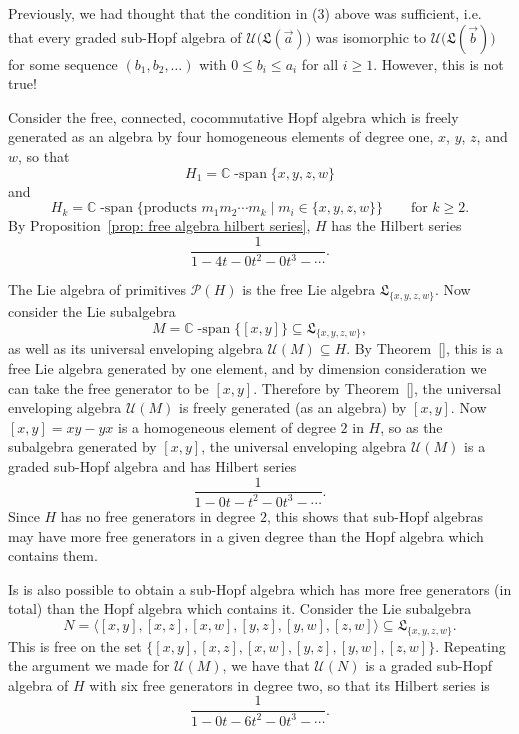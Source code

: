 \documentclass[11pt]{amsart}
\theoremstyle{definition}
\numberwithin{equation}{section}
\def\CC{{\mathbb C}}
\newcommand{\lucas}[1]{\todo[size=\tiny,color=red]{#1 \\ \hfill --- Lucas}}
\begin{document}
Previously, we had thought that the condition in (3) above was sufficient, i.e. that every graded sub-Hopf algebra of $\mathcal{U}\big(\mathfrak{L}(\vec{a})\big)$ was isomorphic to $\mathcal{U}\big(\mathfrak{L}(\vec{b})\big)$ for some sequence $(b_{1}, b_{2}, \ldots)$ with $0 \le b_{i} \le a_{i}$ for all $i \ge 1$.  However, this is not true!  

Consider the free, connected, cocommutative Hopf algebra which is freely generated as an algebra by four homogeneous elements of degree one, $x$, $y$, $z$, and $w$, so that
\[
H_{1} = \CC\operatorname{-span}\{x, y, z, w\}
\]
and
\[
H_{k} = \CC\operatorname{-span}\big\{ \text{products $m_{1} m_{2} \cdots m_{k}$} \;|\; m_{i} \in \{x, y, z, w\} \big\}
\qquad\text{for $k \ge 2$}.
\]
By Proposition~\ref{prop: free algebra hilbert series}, $H$ has the Hilbert series
\[
\frac{1}{1 - 4t - 0 t^{2} - 0 t^{3} - \cdots }.
\]

The Lie algebra of primitives $\mathcal{P}(H)$ is the free Lie algebra $\mathfrak{L}_{\{x, y, z, w\}}$.  Now consider the Lie subalgebra
\[
M = \CC\operatorname{-span}\{[x, y]\} \subseteq \mathfrak{L}_{\{x, y, z, w\}},
\]
as well as its universal enveloping algebra $\mathcal{U}(M) \subseteq H$.
By Theorem~\ref{}, this is a free Lie algebra generated by one element, and by dimension consideration we can take the free generator to be $[x, y]$.  
Therefore by Theorem~\ref{}, the universal enveloping algebra $\mathcal{U}(M)$ is freely generated (as an algebra) by $[x, y]$.
Now $[x, y] = xy - yx$ is a homogeneous element of degree $2$ in $H$, so as the subalgebra generated by $[x, y]$, the universal enveloping algebra $\mathcal{U}(M)$ is a graded sub-Hopf algebra and has Hilbert series
\[
\frac{1}{1 - 0t - t^{2} - 0t^{3} - \cdots}.
\]
Since $H$ has no free generators in degree $2$, this shows that sub-Hopf algebras may have more free generators in a given degree than the Hopf algebra which contains them.

Is is also possible to obtain a sub-Hopf algebra which has more free generators (in total) than the Hopf algebra which contains it.  
Consider the Lie subalgebra
\[
N = \langle [x, y], [x, z], [x, w], [y, z], [y, w], [z, w] \rangle \subseteq \mathfrak{L}_{\{x, y, z, w\}}.
\]
This is free on the set $\{[x, y], [x, z], [x, w], [y, z], [y, w], [z, w]\}$.  \lucas{Definitely true, but details needed.}  Repeating the argument we made for $\mathcal{U}(M)$, we have that $\mathcal{U}(N)$ is a graded sub-Hopf algebra of $H$ with six free generators in degree two, so that its Hilbert series is
\[
\frac{1}{1 - 0t - 6t^{2} - 0 t^{3} - \cdots }.
\]
\end{document}
